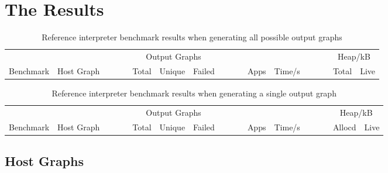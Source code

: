 \section{The Results}\label{the-results}



\begin{table}[h]
\begin{minipage}{\textwidth}
\centering

\begin{tabular}{llcrrrcrrcrr}
\hline 
&  &~~~~& \multicolumn{3}{c}{Output Graphs} &~~~~& & &~~~~& \multicolumn{2}{c}{Heap/kB}\\
Benchmark          & Host Graph\footnotemark & & Total & Unique   & Failed & & Apps & Time/s   & & Total  & Live \\
\hline 

\end{tabular}

\caption[Reference interpreter benchmarks]{Reference interpreter benchmark results when generating all possible output graphs}

\label{table:resultsAll}
\end{minipage}
\end{table}




\begin{table}[h]
\begin{minipage}{\textwidth}
\centering

\begin{tabular}{llcrrrcrrcrr}
\hline 
&  &~~~~& \multicolumn{3}{c}{Output Graphs} &~~~~& & &~~~~& \multicolumn{2}{c}{Heap/kB}\\
Benchmark          & Host Graph\footnotemark & & Total & Unique   & Failed & & Apps & Time/s   & & Allocd & Live \\
\hline 

\end{tabular}

\caption[Reference interpreter benchmarks]{Reference interpreter benchmark results when generating a single output graph}

\label{table:resultsSingle}
\end{minipage}
\end{table}




\subsection{Host Graphs}
\label{subsec:hosts}

